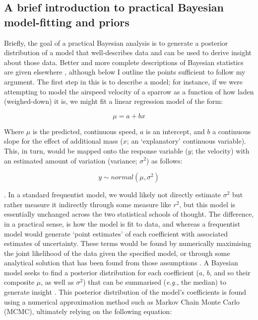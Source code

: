 \documentclass[12pt]{report}
\newcommand{\eg}{\emph{e.g.}\xspace}
\begin{document}
\subsection*{A brief introduction to practical Bayesian model-fitting and priors}
Briefly, the goal of a practical Bayesian analysis is to generate a posterior distribution of a model that well-describes data and can be used to derive insight about those data. Better and more complete descriptions of Bayesian statistics are given elsewhere \autocite[\eg,][]{Gelman2013}, although below I outline the points sufficient to follow my argument. The first step in this is to describe a model; for instance, if we were attempting to model the airspeed velocity of a sparrow as a function of how laden (weighed-down) it is, we might fit a linear regression model of the form:

\begin{equation}
  \mu = a + bx
\end{equation}

Where $\mu$ is the predicted, continuous speed, $a$ is an intercept, and $b$ a continuous slope for the effect of additional mass ($x$; an `explanatory' continuous variable). This, in turn, would be mapped onto the response variable ($y$; the velocity) with an estimated amount of variation (variance; $\sigma^2$) as follows:

\begin{equation}
  y \sim normal (\mu, \sigma^2)
\end{equation}

. In a standard frequentist model, we would likely not directly estimate $\sigma^2$ but rather measure it indirectly through some measure like $r^2$, but this model is essentially unchanged across the two statistical schools of thought. The difference, in a practical sense, is how the model is fit to data, and whereas a frequentist model would generate `point estimates' of each coefficient with associated estimates of uncertainty. These terms would be found by numerically maximising the joint likelihood of the data given the specified model, or through some analytical solution that has been found from those assumptions \autocite{Edwards1984}. A Bayesian model seeks to find a posterior distribution for each coefficient ($a$, $b$, and so their composite $\mu$, as well as $\sigma^2$) that can be summarised (\eg, the median) to generate insight \autocite{Gelman2014}. This posterior distribution of the model's coefficients is found using a numerical approximation method such as Markov Chain Monte Carlo (MCMC), ultimately relying on the following equation:
\end{document}
